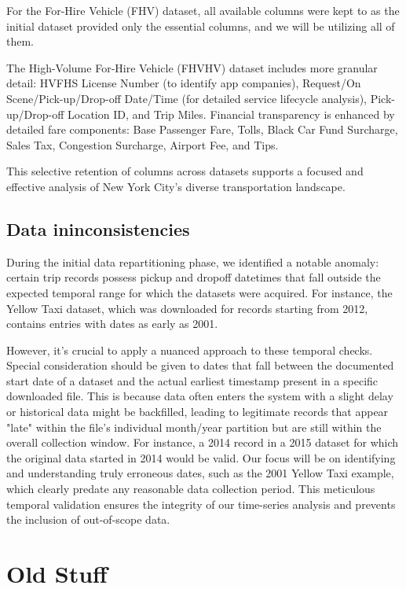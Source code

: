 \documentclass[conference]{IEEEtran}
\begin{document}
For the For-Hire Vehicle (FHV) dataset, all available columns were kept to as the initial dataset provided only the
essential columns, and we will be utilizing all of them.

The High-Volume For-Hire Vehicle (FHVHV) dataset includes more granular detail: HVFHS License Number (to identify app
companies), Request/On Scene/Pick-up/Drop-off Date/Time (for detailed service lifecycle analysis), Pick-up/Drop-off
Location ID, and Trip Miles. Financial transparency is enhanced by detailed fare components: Base Passenger Fare, Tolls,
Black Car Fund Surcharge, Sales Tax, Congestion Surcharge, Airport Fee, and Tips.

This selective retention of columns across datasets supports a focused and effective analysis of New York City's diverse
transportation landscape.

\subsection{Data ininconsistencies}
During the initial data repartitioning phase, we identified a notable anomaly: certain trip records possess pickup and
dropoff datetimes that fall outside the expected temporal range for which the datasets were acquired.
For instance, the Yellow Taxi dataset, which was downloaded for records starting from 2012, contains entries
with dates as early as 2001.

However, it's crucial to apply a nuanced approach to these temporal checks. Special consideration should be given to
dates that fall between the documented start date of a dataset and the actual earliest timestamp present in a specific
downloaded file. This is because data often enters the system with a slight delay or historical data might be backfilled,
leading to legitimate records that appear "late" within the file's individual month/year partition but are still within
the overall collection window. For instance, a 2014 record in a 2015 dataset for which the original data started in 2014
would be valid. Our focus will be on identifying and understanding truly erroneous dates, such as the 2001 Yellow Taxi
example, which clearly predate any reasonable data collection period. This meticulous temporal validation ensures the
integrity of our time-series analysis and prevents the inclusion of out-of-scope data.

\section{Old Stuff}
\end{document}
